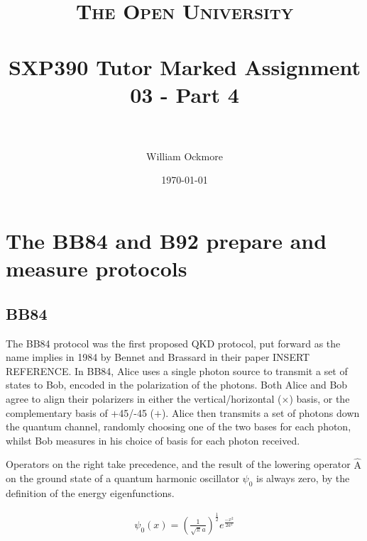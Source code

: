 \documentclass[paper=a4, fontsize=11pt]{scrartcl} %
\title{
\normalfont \normalsize
\textsc{The Open University} \\ [25pt] %
\horrule{0.5pt} \\[0.4cm] %
\huge SXP390 Tutor Marked Assignment 03 - Part 4 \\ %
\horrule{2pt} \\[0.5cm] %
}
\author{William Ockmore} %
\date{\normalsize\today} %
\numberwithin{equation}{section} %
\numberwithin{figure}{section} %
\numberwithin{table}{section} %
\begin{document}
\maketitle %


\section{The BB84 and B92 prepare and measure protocols}

\subsection{BB84}

The BB84 protocol was the first proposed QKD protocol, put forward as the name implies in 1984 by Bennet and Brassard in their paper INSERT REFERENCE.
In BB84, Alice uses a single photon source to transmit a set of states to Bob, encoded in the polarization of the photons. Both Alice and Bob agree
to align their polarizers in either the vertical/horizontal ($\times$) basis, or the complementary basis of +45/-45 ($+$). Alice then transmits
a set of photons down the quantum channel, randomly choosing one of the two bases for each photon, whilst Bob measures in his choice of basis for each
photon received. 


































Operators on the right take precedence, and the result of the lowering operator $\hat{\textrm{A}}$ on the ground state of a quantum harmonic oscillator $\psi_0$ is always zero, by the definition of the energy eigenfunctions.

\begin{align}
\psi_0 (x) =
\left(\frac{1}{\sqrt{\pi}a}\right)^{\frac{1}{2}}
e^{\frac{-x^2}{2a^2}}
\end{align}
\end{document}
